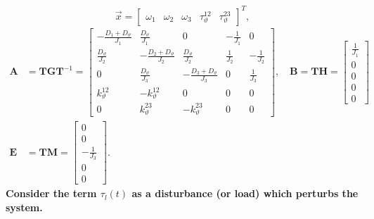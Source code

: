 \documentclass[12pt,a4paper]{scrartcl}
\begin{document}
\begin{onehalfspace}
\begin{mybox}
	\begin{equation*}
		\vec{x} = \left[\begin{matrix} \omega_1 & \omega_2 & \omega_3 & \tau_{\vartheta}^{12} & \tau_{\vartheta}^{23}
		\end{matrix} \right]^T,
	\end{equation*}
	\begin{equation*}
		\begin{aligned}
			{\mathbf{A}} &= \mathbf{T}{\mathbf{G}}\mathbf{T}^{-1} =
			\begin{bmatrix}
				-\frac{D_1 + D_{\vartheta}}{J_1} & \frac{D_{\vartheta}}{J_1} & 0 & -\frac{1}{J_1} & 0 \\[6pt]
				\frac{D_{\vartheta}}{J_2} & -\frac{D_2 + D_{\vartheta}}{J_2} & \frac{D_{\vartheta}}{J_2} & \frac{1}{J_2} & 		-\frac{1}{J_2} \\[6pt]
				0 & \frac{D_{\vartheta}}{J_3} & -\frac{D_3 + D_{\vartheta}}{J_3} & 0 & \frac{1}{J_3} \\[6pt]
				k_{\vartheta}^{12} & -k_{\vartheta}^{12} & 0 & 0 & 0 \\[6pt]			
				0 & k_{\vartheta}^{23} & -k_{\vartheta}^{23} & 0 & 0
			\end{bmatrix}, \quad
			{\mathbf{B}} = \mathbf{T}{\mathbf{H}} =
			\begin{bmatrix}
				\frac{1}{J_1} \\[6pt]
				0 \\[6pt]			
				0 \\[6pt]
				0 \\[6pt]
				0
			\end{bmatrix} \\[6pt]
			{\mathbf{E}} &= \mathbf{T}{\mathbf{M}} =
			\begin{bmatrix}
				0 \\[6pt]
				0 \\[6pt]
				-\frac{1}{J_3} \\[6pt]
				0 \\[6pt]
				0
			\end{bmatrix}.
		\end{aligned}
	\end{equation*}      
	\textbf{Consider the term $\tau_l(t)$ as a disturbance (or load) which perturbs 
		the system.}
	

\end{mybox}
\end{onehalfspace}
\end{document}
